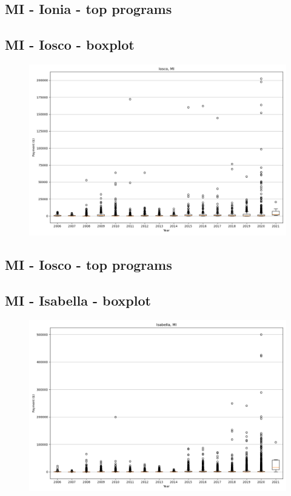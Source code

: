 \subsection*{MI - Ionia - top programs}

\newpage
\subsection*{MI - Iosco - boxplot}
\begin{figure}[h]
\centering
\includegraphics[width=7in]{../output/boxplots/counties/Iosco-MI_boxplot.png}
\end{figure}


\subsection*{MI - Iosco - top programs}

\newpage
\subsection*{MI - Isabella - boxplot}
\begin{figure}[h]
\centering
\includegraphics[width=7in]{../output/boxplots/counties/Isabella-MI_boxplot.png}
\end{figure}


